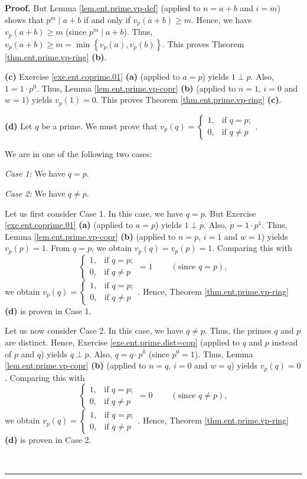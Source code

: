 \documentclass[numbers=enddot,12pt,final,onecolumn,notitlepage]{scrartcl}%
\numberwithin{exer}{subsection}
\theoremstyle{definition}
\newenvironment{proof}[1][Proof]{\noindent\textbf{#1.} }{\ \rule{0.5em}{0.5em}}
\begin{document}
\begin{proof}
But Lemma \ref{lem.ent.prime.vp-def} (applied to $n=a+b$ and $i=m$) shows that
$p^{m}\mid a+b$ if and only if $v_{p}\left(  a+b\right)  \geq m$. Hence, we
have $v_{p}\left(  a+b\right)  \geq m$ (since $p^{m}\mid a+b$). Thus,
$v_{p}\left(  a+b\right)  \geq m=\min\left\{  v_{p}\left(  a\right)
,v_{p}\left(  b\right)  \right\}  $. This proves Theorem
\ref{thm.ent.prime.vp-ring} \textbf{(b)}.

\textbf{(c)} Exercise \ref{exe.ent.coprime.01} \textbf{(a)} (applied to $a=p$)
yields $1\perp p$. Also, $1=1\cdot p^{0}$. Thus, Lemma
\ref{lem.ent.prime.vp-copr} \textbf{(b)} (applied to $n=1$, $i=0$ and $w=1$)
yields $v_{p}\left(  1\right)  =0$. This proves Theorem
\ref{thm.ent.prime.vp-ring} \textbf{(c)}.

\textbf{(d)} Let $q$ be a prime. We must prove that $v_{p}\left(  q\right)  =%
\begin{cases}
1, & \text{if }q=p;\\
0, & \text{if }q\neq p
\end{cases}
$.

We are in one of the following two cases:

\textit{Case 1:} We have $q=p$.

\textit{Case 2:} We have $q\neq p$.

Let us first consider Case 1. In this case, we have $q=p$. But Exercise
\ref{exe.ent.coprime.01} \textbf{(a)} (applied to $a=p$) yields $1\perp p$.
Also, $p=1\cdot p^{1}$. Thus, Lemma \ref{lem.ent.prime.vp-copr} \textbf{(b)}
(applied to $n=p$, $i=1$ and $w=1$) yields $v_{p}\left(  p\right)  =1$. From
$q=p$, we obtain $v_{p}\left(  q\right)  =v_{p}\left(  p\right)  =1$.
Comparing this with
\[%
\begin{cases}
1, & \text{if }q=p;\\
0, & \text{if }q\neq p
\end{cases}
=1\ \ \ \ \ \ \ \ \ \ \left(  \text{since }q=p\right)  ,
\]
we obtain $v_{p}\left(  q\right)  =%
\begin{cases}
1, & \text{if }q=p;\\
0, & \text{if }q\neq p
\end{cases}
$. Hence, Theorem \ref{thm.ent.prime.vp-ring} \textbf{(d)} is proven in Case 1.

Let us now consider Case 2. In this case, we have $q\neq p$. Thus, the primes
$q$ and $p$ are distinct. Hence, Exercise \ref{exe.ent.prime.dist=cop}
(applied to $q$ and $p$ instead of $p$ and $q$) yields $q\perp p$. Also,
$q=q\cdot p^{0}$ (since $p^{0}=1$). Thus, Lemma \ref{lem.ent.prime.vp-copr}
\textbf{(b)} (applied to $n=q$, $i=0$ and $w=q$) yields $v_{p}\left(
q\right)  =0$. Comparing this with
\[%
\begin{cases}
1, & \text{if }q=p;\\
0, & \text{if }q\neq p
\end{cases}
=0\ \ \ \ \ \ \ \ \ \ \left(  \text{since }q\neq p\right)  ,
\]
we obtain $v_{p}\left(  q\right)  =%
\begin{cases}
1, & \text{if }q=p;\\
0, & \text{if }q\neq p
\end{cases}
$. Hence, Theorem \ref{thm.ent.prime.vp-ring} \textbf{(d)} is proven in Case 2.


\end{proof}
\end{document}
